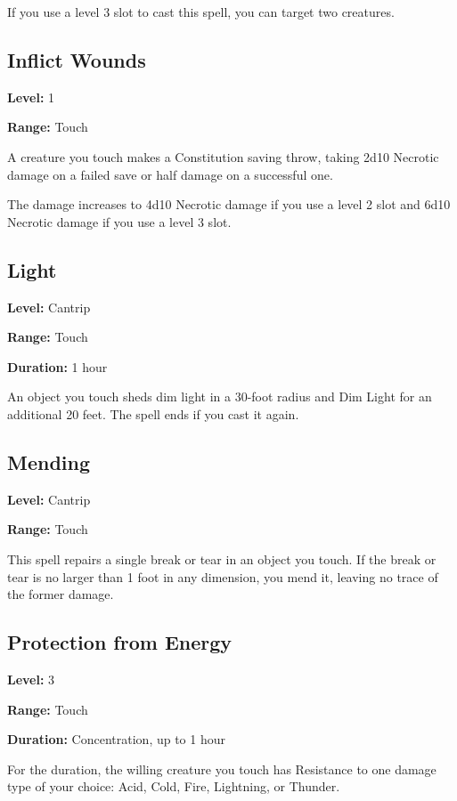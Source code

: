 \documentclass[12pt,letterpaper,twocolumn,openany,nodeprecatedcode,bg=none]{dndbook}
\let\oldsubsection\subsection
\renewcommand{\subsection}[1]{%
  \needspace{5\baselineskip}%
  \oldsubsection{#1}%
}
\begin{document}
If you use a level 3 slot to cast this spell, you can target two
creatures.

\subsection{Inflict Wounds}\label{inflict-wounds}

\textbf{Level:} 1

\textbf{Range:} Touch

A creature you touch makes a Constitution saving throw, taking 2d10
Necrotic damage on a failed save or half damage on a successful one.

The damage increases to 4d10 Necrotic damage if you use a level 2 slot
and 6d10 Necrotic damage if you use a level 3 slot.

\subsection{Light}\label{light}

\textbf{Level:} Cantrip

\textbf{Range:} Touch

\textbf{Duration:} 1 hour

An object you touch sheds dim light in a 30-foot radius and Dim Light
for an additional 20 feet. The spell ends if you cast it again.

\newpage

\subsection{Mending}\label{mending}

\textbf{Level:} Cantrip

\textbf{Range:} Touch

This spell repairs a single break or tear in an object you touch. If the
break or tear is no larger than 1 foot in any dimension, you mend it,
leaving no trace of the former damage.

\subsection{Protection from Energy}\label{protection-from-energy}

\textbf{Level:} 3

\textbf{Range:} Touch

\textbf{Duration:} Concentration, up to 1 hour

For the duration, the willing creature you touch has Resistance to one
damage type of your choice: Acid, Cold, Fire, Lightning, or Thunder.
\end{document}
